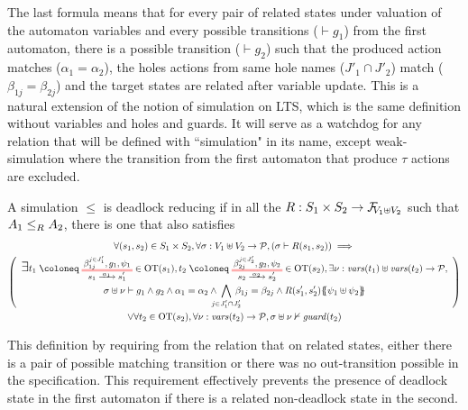 \documentclass{article}
\begin{document}
The last formula means that for every pair of related states under valuation of the automaton variables and every possible transitions (\(\vdash g_1\)) from the first automaton, there is a possible transition (\(\vdash g_2\)) such that the produced action matches (\(\alpha_1 = \alpha_2\)), the holes actions from same hole names (\(J'_1 \cap J'_2\)) match (\(\beta_{1j} = \beta_{2j}\)) and the target states are related after variable update.
This is a natural extension of the notion of simulation on LTS, which is the same definition without variables and holes and guards.
It will serve as a watchdog for any relation that will be defined with ``simulation" in its name, except weak-simulation where the transition from the first automaton that produce \(\tau\) actions are excluded.

\begin{defi}
A simulation \(\leq\) is deadlock reducing if in all the \(R: S_1 \times S_2 \to \rformulae[V_1 \uplus V_2]\) such that \(\wrel{A_1}{A_2}{R}\), there is one that also satisfies
\begin{multline*}
	\forall \mpar{s_1, s_2} \in S_1 \times S_2, \forall \sigma: V_1 \uplus V_2 \to \values, \mpar{\sigma \vdash R\mpar{s_1, s_2}} \implies \\
	\mpar{\everymath{\displaystyle}\begin{array}{c}
		\bigsymb{\exists} t_1 \defobject \OTx{1}{}{1}{1} \in \fOT{s_1}, t_2 \defobject \OTx{2}{}{2}{2} \in \fOT{s_2}, \exists \nu: \fvars{t_1} \uplus \fvars{t_2} \to \values, \\
		\sigma \uplus \nu \vdash g_1 \wedge g_2 \wedge \alpha_1 = \alpha_2 \wedge \bigwedge_\subbox{j \in J'_1 \cap J'_2} \beta_{1j} = \beta_{2j} \wedge R\mpar{s'_1, s'_2}\psubst{\psi_1 \uplus \psi_2}
	\end{array}} \\
	\vee \forall t_2 \in \fOT{s_2}, \forall \nu: \fvars{t_2} \to \values, \sigma \uplus \nu \nvdash \fguard{t_2}
\end{multline*}
\end{defi}
This definition  by requiring from the relation that on related states, either there is a pair of possible matching transition or there was no out-transition possible in the specification.
This requirement effectively prevents the presence of deadlock state in the first automaton if there is a related non-deadlock state in the second.
\end{document}
